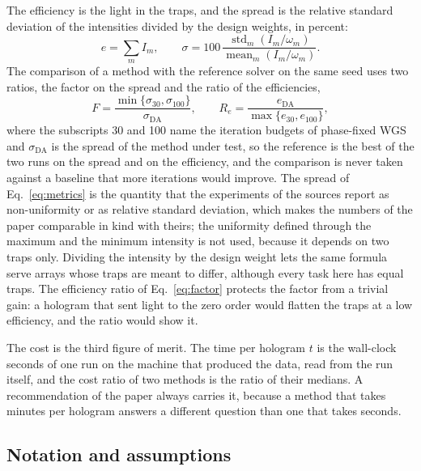 The efficiency is the light in the traps, and the spread is the relative standard deviation of the intensities divided by the design weights, in percent:
\begin{equation}
e=\sum_mI_m,\qquad \sigma=100\,\frac{\operatorname{std}_m(I_m/\omega_m)}{\operatorname{mean}_m(I_m/\omega_m)}.\label{eq:metrics}
\end{equation}
The comparison of a method with the reference solver on the same seed uses two ratios, the factor on the spread and the ratio of the efficiencies,
\begin{equation}
F=\frac{\min\{\sigma_{30},\sigma_{100}\}}{\sigma_{\mathrm{DA}}},\qquad R_e=\frac{e_{\mathrm{DA}}}{\max\{e_{30},e_{100}\}},\label{eq:factor}
\end{equation}
where the subscripts 30 and 100 name the iteration budgets of phase-fixed WGS and $\sigma_{\mathrm{DA}}$ is the spread of the method under test, so the reference is the best of the two runs on the spread and on the efficiency, and the comparison is never taken against a baseline that more iterations would improve. The spread of Eq.~\ref{eq:metrics} is the quantity that the experiments of the sources report as non-uniformity or as relative standard deviation, which makes the numbers of the paper comparable in kind with theirs; the uniformity defined through the maximum and the minimum intensity is not used, because it depends on two traps only. Dividing the intensity by the design weight lets the same formula serve arrays whose traps are meant to differ, although every task here has equal traps. The efficiency ratio of Eq.~\ref{eq:factor} protects the factor from a trivial gain: a hologram that sent light to the zero order would flatten the traps at a low efficiency, and the ratio would show it.

The cost is the third figure of merit. The time per hologram $t$ is the wall-clock seconds of one run on the machine that produced the data, read from the run itself, and the cost ratio of two methods is the ratio of their medians. A recommendation of the paper always carries it, because a method that takes minutes per hologram answers a different question than one that takes seconds.

\subsection{Notation and assumptions}

